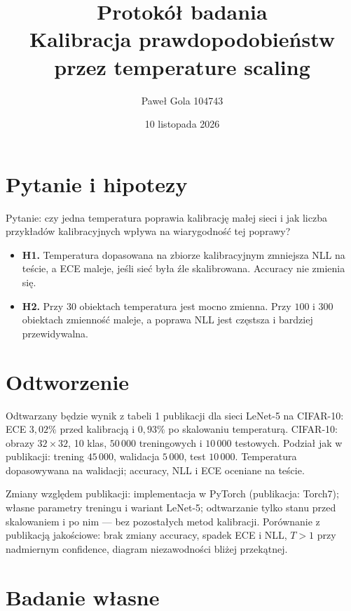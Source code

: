 \documentclass[10pt,a4paper]{article}
\begin{document}
\title{Protokół badania\\Kalibracja prawdopodobieństw przez temperature scaling}
\author{Paweł Gola 104743}
\date{10 listopada 2026}

\maketitle

\section{Pytanie i hipotezy}

\noindent
Pytanie: czy jedna temperatura poprawia kalibrację małej sieci i jak liczba przykładów kalibracyjnych wpływa na wiarygodność tej poprawy?

\begin{itemize}
    \item \textbf{H1.} Temperatura dopasowana na zbiorze kalibracyjnym zmniejsza NLL na teście, a ECE maleje, jeśli sieć była źle skalibrowana. Accuracy nie zmienia się.
    \item \textbf{H2.} Przy $30$ obiektach temperatura jest mocno zmienna. Przy $100$ i $300$ obiektach zmienność maleje, a poprawa NLL jest częstsza i bardziej przewidywalna.
\end{itemize}

\section{Odtworzenie}

\noindent
Odtwarzany będzie wynik z tabeli 1 publikacji dla sieci LeNet-5 na CIFAR-10: ECE $3{,}02\%$ przed kalibracją i $0{,}93\%$ po skalowaniu temperaturą.
CIFAR-10: obrazy $32\times32$, 10 klas, $50\,000$ treningowych i $10\,000$ testowych.
Podział jak w publikacji: trening $45\,000$, walidacja $5\,000$, test $10\,000$.
Temperatura dopasowywana na walidacji; accuracy, NLL i ECE oceniane na teście.

\noindent
Zmiany względem publikacji: implementacja w PyTorch (publikacja: Torch7); własne parametry treningu i wariant LeNet-5; odtwarzanie tylko stanu przed skalowaniem i po nim --- bez pozostałych metod kalibracji.
Porównanie z publikacją jakościowe: brak zmiany accuracy, spadek ECE i NLL, $T>1$ przy nadmiernym confidence, diagram niezawodności bliżej przekątnej.

\section{Badanie własne}
\end{document}
